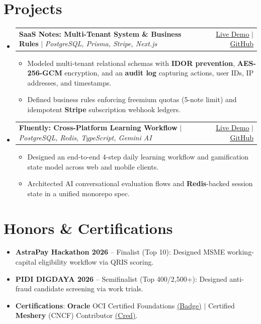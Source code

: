 \documentclass[letterpaper,11pt]{article}
\makeatletter
\newcommand{\resumeItem}[1]{\item\small{#1}}
\newcommand{\resumeProjectHeading}[2]{
  \item
    \begin{tabular*}{\textwidth}{l@{\extracolsep{\fill}}r}
      \small#1 & #2 \\
    \end{tabular*}\vspace{-1.2pt}
}
\newcommand{\resumeSubHeadingListStart}{\begin{itemize}[leftmargin=0in, label={}, itemsep=1.2pt, parsep=0pt, topsep=0.5pt]}
\newcommand{\resumeSubHeadingListEnd}{\end{itemize}\vspace{-1.5pt}}
\newcommand{\resumeItemListStart}{\begin{itemize}[leftmargin=15pt, label=\tiny$\bullet$, itemsep=1.1pt, parsep=0pt, topsep=0.5pt]}
\newcommand{\resumeItemListEnd}{\end{itemize}}
\makeatother
\begin{document}
\section[Projects]{Projects \hfill \normalfont\footnotesize{}}
    \resumeSubHeadingListStart
      \resumeProjectHeading
          {\textbf{SaaS Notes: Multi-Tenant System \& Business Rules} $|$ \emph{PostgreSQL, Prisma, Stripe, Next.js}}{{\href{https://saas-noteapp.vercel.app/}{\underline{Live Demo}}} $|$ {\href{https://github.com/kyyril/saas-noteapp}{\underline{GitHub}}}}
          \resumeItemListStart
            \resumeItem{Modeled multi-tenant relational schemas with \textbf{IDOR prevention}, \textbf{AES-256-GCM} encryption, and an \textbf{audit log} capturing actions, user IDs, IP addresses, and timestamps.}
            \resumeItem{Defined business rules enforcing freemium quotas (5-note limit) and idempotent \textbf{Stripe} subscription webhook ledgers.}
          \resumeItemListEnd
      \resumeProjectHeading
          {\textbf{Fluently: Cross-Platform Learning Workflow} $|$ \emph{PostgreSQL, Redis, TypeScript, Gemini AI}}{{\href{https://fluentlyy.vercel.app}{\underline{Live Demo}}} $|$ {\href{https://github.com/kyyril/Fluently}{\underline{GitHub}}}}
          \resumeItemListStart
            \resumeItem{Designed an end-to-end 4-step daily learning workflow and gamification state model across web and mobile clients.}
            \resumeItem{Architected AI conversational evaluation flows and \textbf{Redis}-backed session state in a unified monorepo spec.}
          \resumeItemListEnd
    \resumeSubHeadingListEnd

\section{Honors \& Certifications}
  \begin{itemize}[leftmargin=15pt, label=\tiny$\bullet$, itemsep=0.3pt, parsep=0pt, topsep=0.1pt]
    \resumeItem{\textbf{AstraPay Hackathon 2026} -- Finalist (Top 10): Designed MSME working-capital eligibility workflow via QRIS scoring.}
    \resumeItem{\textbf{PIDI DIGDAYA 2026} -- Semifinalist (Top 400/2,500+): Designed anti-fraud candidate screening via work trials.}
    \resumeItem{\textbf{Certifications}: \textbf{Oracle} OCI Certified Foundations \href{https://catalog-education.oracle.com/ords/certview/sharebadge_m?id=8B649FA58712B4081E58C95EC3618C77402518C510B850A9C86F02FCB73960A5}{\underline{(Badge)}} $|$ Certified \textbf{Meshery} (CNCF) Contributor \href{https://cloud.meshery.io/academy/certificates/dcd71d58-dd35-45d3-86a9-857ac980e08e}{\underline{(Cred)}}.}
  \end{itemize}\vspace{-3pt}
\end{document}

